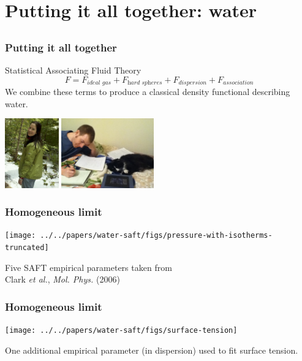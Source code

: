 \section{Putting it all together: water}

\subsection{}

\begin{frame}
  \frametitle{Putting it all together}
  \begin{block}{Statistical Associating Fluid Theory}
    \[
    F = F_{\textit{ideal gas}} + F_{\textit{hard spheres}} + F_{\textit{dispersion}} + F_{\textit{association}}
    \]
    We combine these terms to produce a classical density functional
    describing water.
  \end{block}
  \begin{center}
    \includegraphics[height=3cm]{figs/HughesJessica}
    \includegraphics[height=3cm]{figs/KrebsEric}
  \end{center}
\end{frame}

\begin{frame}
  \frametitle{Homogeneous limit}
  \begin{center}
    \vspace{-1em}
    \texttt{[image: ../../papers/water-saft/figs/pressure-with-isotherms-truncated]}
   \end{center}
  Five SAFT empirical parameters taken from\\\hfill Clark \emph{et al.}, \emph{Mol. Phys.}
  (2006)
\end{frame}

\begin{frame}
  \frametitle{Homogeneous limit}
  \begin{center}
    \vspace{-1em}
    \texttt{[image: ../../papers/water-saft/figs/surface-tension]}
  \end{center}
  \vspace{-1.5em}
  One additional empirical parameter (in dispersion) used to fit
  surface tension.
\end{frame}

